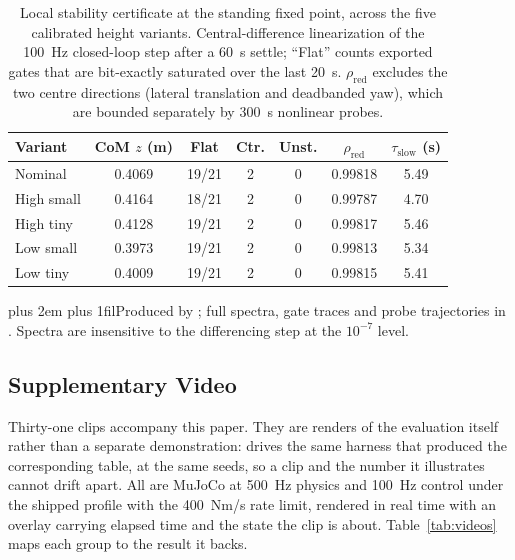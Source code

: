 \documentclass[conference]{IEEEtran}
\newcommand{\tabnote}{\par\leftskip=0pt\rightskip=0pt plus 2em%
  \parfillskip=0pt plus 1fil\relax}
\begin{document}
\begin{table}[t]
\centering
\caption{Local stability certificate at the standing fixed point, across the five calibrated height variants. Central-difference linearization of the \SI{100}{Hz} closed-loop step after a \SI{60}{s} settle; ``Flat'' counts exported gates that are bit-exactly saturated over the last \SI{20}{s}. $\rho_{\text{red}}$ excludes the two centre directions (lateral translation and deadbanded yaw), which are bounded separately by \SI{300}{s} nonlinear probes.}
\label{tab:stability}
\setlength{\tabcolsep}{4pt}
\footnotesize
\begin{tabular}{@{}lcccccc@{}}
\toprule
Variant & CoM $z$ (m) & Flat & Ctr. & Unst. & $\rho_{\text{red}}$ & $\tau_{\text{slow}}$ (s) \\
\midrule
Nominal    & 0.4069 & 19/21 & 2 & 0 & 0.99818 & 5.49 \\
High small & 0.4164 & 18/21 & 2 & 0 & 0.99787 & 4.70 \\
High tiny  & 0.4128 & 19/21 & 2 & 0 & 0.99817 & 5.46 \\
Low small  & 0.3973 & 19/21 & 2 & 0 & 0.99813 & 5.34 \\
Low tiny   & 0.4009 & 19/21 & 2 & 0 & 0.99815 & 5.41 \\
\bottomrule
\end{tabular}
\tabnote\noindent Produced by ; full
spectra, gate traces and probe trajectories in
. Spectra are
insensitive to the differencing step at the $10^{-7}$ level.
\end{table}

\subsection{Supplementary Video}
\label{sec:videos}

Thirty-one clips accompany this paper. They are renders of the evaluation
itself rather than a separate demonstration: 
drives the same harness that produced the corresponding table, at the same
seeds, so a clip and the number it illustrates cannot drift apart. All are
MuJoCo at \SI{500}{Hz} physics and \SI{100}{Hz} control under the shipped
profile with the \SI{400}{Nm/s} rate limit, rendered in real time with an
overlay carrying elapsed time and the state the clip is about.
Table~\ref{tab:videos} maps each group to the result it backs.
\end{document}
